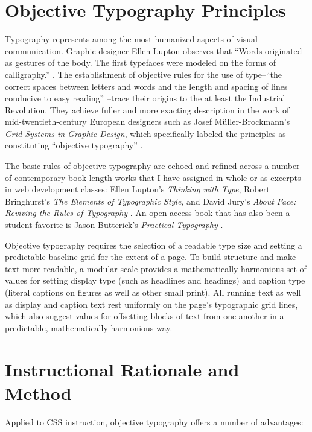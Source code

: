 \documentclass[sigconf,sigplan,review,anonymous]{acmart}
\begin{document}
\section{Objective Typography Principles}

Typography represents among the most humanized aspects of visual communication. Graphic designer Ellen Lupton observes that “Words originated as gestures of the body. The first typefaces were modeled on the forms of calligraphy.” \cite[p.~13]{el:type}. The establishment of objective rules for the use of type--“the correct spaces between letters and words and the length and spacing of lines conducive to easy reading” \cite[p.~19]{mb:grid}--trace their origins to the at least the Industrial Revolution. They achieve fuller and more exacting description in the work of mid-twentieth-century European designers such as Josef Müller-Brockmann’s {\itshape Grid Systems in Graphic Design}, which specifically labeled the principles as constituting “objective typography” \cite[p.~7]{mb:grid}.

The basic rules of objective typography are echoed and refined across a number of contemporary book-length works that I have assigned in whole or as excerpts in web development classes: Ellen Lupton’s {\itshape Thinking with Type}, Robert Bringhurst’s {\itshape The Elements of Typographic Style}, and David Jury’s {\itshape About Face: Reviving the Rules of Typography} \cite{el:type,rb:style,dj:face}. An open-access book that has also been a student favorite is Jason Butterick’s {\itshape Practical Typography} \cite{jb:pt}.

Objective typography requires the selection of a readable type size and setting a predictable baseline grid for the extent of a page. To build structure and make text more readable, a modular scale provides a mathematically harmonious set of values for setting display type (such as headlines and headings) and caption type (literal captions on figures as well as other small print). All running text as well as display and caption text rest uniformly on the page’s typographic grid lines, which also suggest values for offsetting blocks of text from one another in a predictable, mathematically harmonious way.

\section{Instructional Rationale and Method}

Applied to CSS instruction, objective typography offers a number of advantages:
\end{document}
